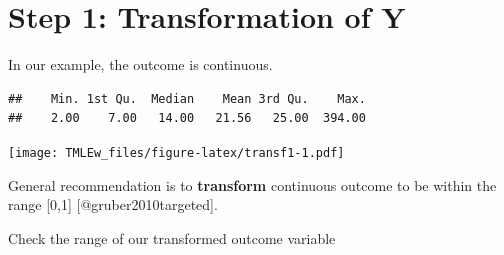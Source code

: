 \documentclass[
]{book}
\newenvironment{Shaded}{\begin{snugshade}}{\end{snugshade}}
\newcommand{\AttributeTok}[1]{\textcolor[rgb]{0.77,0.63,0.00}{#1}}
\newcommand{\FunctionTok}[1]{\textcolor[rgb]{0.00,0.00,0.00}{#1}}
\newcommand{\NormalTok}[1]{#1}
\newcommand{\OtherTok}[1]{\textcolor[rgb]{0.56,0.35,0.01}{#1}}
\newcommand{\SpecialCharTok}[1]{\textcolor[rgb]{0.00,0.00,0.00}{#1}}
\newcommand{\StringTok}[1]{\textcolor[rgb]{0.31,0.60,0.02}{#1}}
\begin{document}
\hypertarget{step-1-transformation-of-y}{%
\section{Step 1: Transformation of Y}\label{step-1-transformation-of-y}}

In our example, the outcome is continuous.

\begin{Shaded}
\end{Shaded}

\begin{verbatim}
##    Min. 1st Qu.  Median    Mean 3rd Qu.    Max. 
##    2.00    7.00   14.00   21.56   25.00  394.00
\end{verbatim}

\begin{Shaded}
\end{Shaded}

\texttt{[image: TMLEw\_files/figure-latex/transf1-1.pdf]}

\begin{rmdcomment}
General recommendation is to \textbf{transform} continuous outcome to be
within the range {[}0,1{]} {[}@gruber2010targeted{]}.
\end{rmdcomment}

\begin{Shaded}
\end{Shaded}

Check the range of our transformed outcome variable
\end{document}
